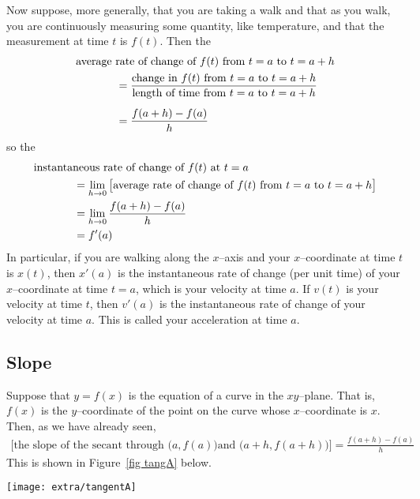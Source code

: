 Now suppose, more generally, that you are taking a walk and that
as you walk, you are continuously measuring some quantity, like temperature,
and that the measurement at time $t$ is $f(t)$. Then the
\begin{align*}
&\text{average rate of change of $f(t)$ from $t=a$ to $t=a+h$} \\
&\hskip0.5in=\frac{\text{change in $f(t)$ from $t=a$ to $t=a+h$}}
       {\text{length of time from $t=a$ to $t=a+h$}} \\[5pt]
&\hskip0.5in=\frac{f(a+h)-f(a)}{h}
\end{align*}
so the
\begin{align*}
&\text{instantaneous rate of change of $f(t)$ at $t=a$} \\
&\hskip0.5in=\lim_{h\rightarrow 0}
\big[\text{average rate of change of $f(t)$ from $t=a$ to $t=a+h$}\big]\\
&\hskip0.5in=\lim_{h\rightarrow 0}\frac{f(a+h)-f(a)}{h} \\
&\hskip0.5in= f'(a)
\end{align*}
In particular, if you are walking along the $x$--axis and your $x$--coordinate
at time $t$ is $x(t)$, then $x'(a)$ is the instantaneous rate of change
(per unit time) of your $x$--coordinate at time $t=a$, which is
your velocity at time $a$. If $v(t)$ is your velocity at time $t$, then
$v'(a)$ is the instantaneous rate of change of your velocity at time
$a$. This is called your acceleration at time $a$.

\subsection*{Slope}

Suppose that $y=f(x)$ is the equation of a curve in the $xy$--plane.
That is, $f(x)$ is the $y$--coordinate of the point on the curve whose
$x$--coordinate is $x$. Then, as we have already seen,
\begin{align*}
\big[\text{the slope of the secant through $\big(a,f(a)\big)$
       and $\big(a+h,f(a+h)\big)$}\big]
=\frac{f(a+h)-f(a)}{h}
\end{align*}
This is shown in Figure~\ref{fig tangA} below.
\begin{fig}\label{fig tangA}
  \begin{center}
  \texttt{[image: extra/tangentA]}
  \end{center}
\end{fig}

